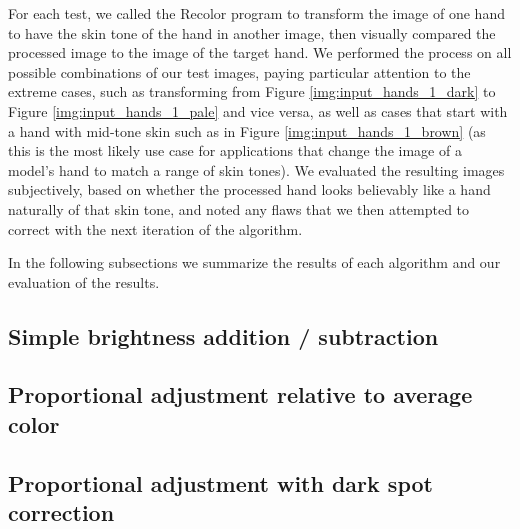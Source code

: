  For each test, we called the Recolor program to transform the image of one hand to have the skin tone of the hand in another image, then visually compared the processed image to the image of the target hand. We performed the process on all possible combinations of our test images, paying particular attention to the extreme cases, such as transforming from Figure \ref{img:input_hands_1_dark} to Figure \ref{img:input_hands_1_pale} and vice versa, as well as cases that start with a hand with mid-tone skin such as in Figure \ref{img:input_hands_1_brown} (as this is the most likely use case for applications that change the image of a model's hand to match a range of skin tones). We evaluated the resulting images subjectively, based on whether the processed hand looks believably like a hand naturally of that skin tone, and noted any flaws that we then attempted to correct with the next iteration of the algorithm.

In the following subsections we summarize the results of each algorithm and our evaluation of the results.

\subsection{Simple brightness addition / subtraction}


\subsection{Proportional adjustment relative to average color}


\subsection{Proportional adjustment with dark spot correction}


% 